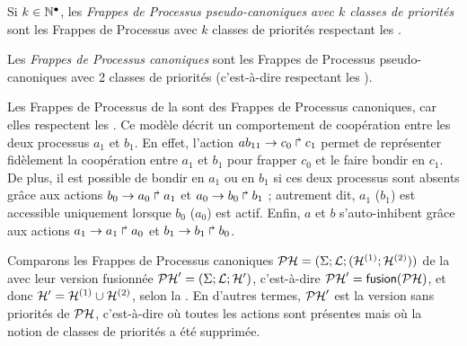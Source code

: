 \begin{definition}
  Si $k \in \mathbb{N}^\bullet$, les \emph{Frappes de Processus pseudo-canoniques avec $k$ classes de priorités}
  sont les Frappes de Processus avec $k$ classes de priorités
  respectant les \allcr.
\end{definition}

\begin{definition}
  Les \emph{Frappes de Processus canoniques}
  sont les Frappes de Processus pseudo-canoniques avec 2 classes de priorités
  (c'est-à-dire respectant les \allcr).
\end{definition}



\begin{example}
  Les Frappes de Processus de la 
  sont des Frappes de Processus canoniques,
  car elles respectent les \allcr.
  Ce modèle décrit un comportement de coopération entre les deux processus $a_1$ et $b_1$.
  En effet, l'action $ab_{11}\rightarrow c_0\Rsh c_1$
  permet de représenter fidèlement la coopération entre $a_1$ et $b_1$ pour
  frapper $c_0$ et le faire bondir en $c_1$.
  De plus, il est possible de bondir en $a_1$ ou en $b_1$ si ces deux processus sont absents
  grâce aux actions $b_0\rightarrow a_0\Rsh a_1$ et $a_0\rightarrow b_0\Rsh b_1$ ;
  autrement dit, $a_1$ (\resp $b_1$) est accessible uniquement lorsque $b_0$
  (\resp $a_0$) est actif.
  Enfin, $a$ et $b$ s'auto-inhibent grâce aux actions
  $a_1\rightarrow a_1\Rsh a_0$ et $b_1\rightarrow b_1\Rsh b_0$.
  
  Comparons les Frappes de Processus canoniques $\mathcal{PH} = (\Sigma; \mathcal{L}; (\mathcal{H}^{(1)}; \mathcal{H}^{(2)}))$
  de la  avec leur version fusionnée $\mathcal{PH}' = (\Sigma; \mathcal{L}; \mathcal{H}')$,
  c'est-à-dire $\mathcal{PH}' = \mathsf{fusion}(\mathcal{PH})$, et donc $\mathcal{H}' = \mathcal{H}^{(1)} \cup \mathcal{H}^{(2)}$,
  selon la .
  En d'autres termes, $\mathcal{PH}'$ est la version sans priorités de $\mathcal{PH}$,
  c'est-à-dire où toutes les actions sont présentes mais où la notion de classes de priorités
  a été supprimée.
  

\end{example}
